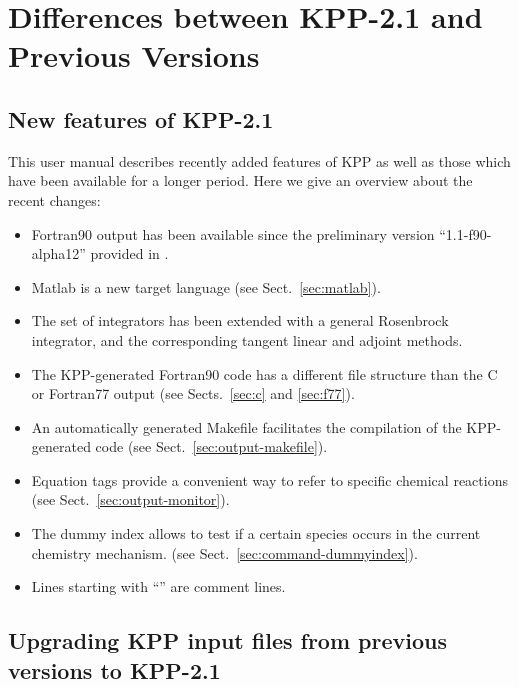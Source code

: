 \documentclass[twoside]{article}
\begin{document}
\section{Differences between KPP-2.1 and Previous Versions}

\subsection{New features of KPP-2.1}

This user manual describes recently added features of KPP as well as
those which have been available for a longer period. Here we give an
overview about the recent changes:

\begin{itemize}
\item Fortran90 output has been available since the preliminary version
  ``1.1-f90-alpha12'' provided in \citet{1666}.
\item Matlab is a new target language (see Sect.~\ref{sec:matlab}).
\item The set of integrators has been extended with a general Rosenbrock
  integrator, and the corresponding tangent linear and adjoint methods.
\item The KPP-generated Fortran90 code has a different file structure
  than the C or Fortran77 output (see Sects.~\ref{sec:c} and
  \ref{sec:f77}).
\item An automatically generated Makefile facilitates the compilation of
  the KPP-generated code (see Sect.~\ref{sec:output-makefile}).
\item Equation tags provide a convenient way to refer to specific
  chemical reactions (see Sect.~\ref{sec:output-monitor}).
\item The dummy index allows to test if a certain species occurs in the
  current chemistry mechanism. (see Sect.~\ref{sec:command-dummyindex}).
\item Lines starting with ``\code{//}'' are comment lines.
\end{itemize}

\subsection{Upgrading KPP input files from previous versions to KPP-2.1}
\end{document}
